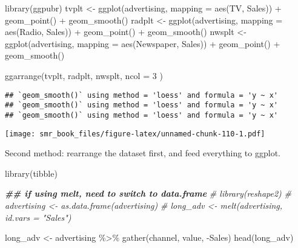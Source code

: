 \documentclass[
  oneside]{book}
\newenvironment{Shaded}{\begin{snugshade}}{\end{snugshade}}
\newcommand{\AttributeTok}[1]{\textcolor[rgb]{0.77,0.63,0.00}{#1}}
\newcommand{\CommentTok}[1]{\textcolor[rgb]{0.56,0.35,0.01}{\textit{#1}}}
\newcommand{\DecValTok}[1]{\textcolor[rgb]{0.00,0.00,0.81}{#1}}
\newcommand{\DocumentationTok}[1]{\textcolor[rgb]{0.56,0.35,0.01}{\textbf{\textit{#1}}}}
\newcommand{\FunctionTok}[1]{\textcolor[rgb]{0.00,0.00,0.00}{#1}}
\newcommand{\NormalTok}[1]{#1}
\newcommand{\OtherTok}[1]{\textcolor[rgb]{0.56,0.35,0.01}{#1}}
\newcommand{\SpecialCharTok}[1]{\textcolor[rgb]{0.00,0.00,0.00}{#1}}
\begin{document}
\begin{Shaded}
\begin{Highlighting}[]
\FunctionTok{library}\NormalTok{(ggpubr)}
\NormalTok{tvplt }\OtherTok{\textless{}{-}} \FunctionTok{ggplot}\NormalTok{(advertising, }\AttributeTok{mapping =} \FunctionTok{aes}\NormalTok{(TV, Sales)) }\SpecialCharTok{+}
  \FunctionTok{geom\_point}\NormalTok{() }\SpecialCharTok{+}
  \FunctionTok{geom\_smooth}\NormalTok{()}
\NormalTok{radplt }\OtherTok{\textless{}{-}} \FunctionTok{ggplot}\NormalTok{(advertising, }\AttributeTok{mapping =} \FunctionTok{aes}\NormalTok{(Radio, Sales)) }\SpecialCharTok{+}
  \FunctionTok{geom\_point}\NormalTok{() }\SpecialCharTok{+}
  \FunctionTok{geom\_smooth}\NormalTok{()}
\NormalTok{nwsplt }\OtherTok{\textless{}{-}} \FunctionTok{ggplot}\NormalTok{(advertising, }\AttributeTok{mapping =} \FunctionTok{aes}\NormalTok{(Newspaper, Sales)) }\SpecialCharTok{+}
  \FunctionTok{geom\_point}\NormalTok{() }\SpecialCharTok{+}
  \FunctionTok{geom\_smooth}\NormalTok{()}

\FunctionTok{ggarrange}\NormalTok{(tvplt, radplt, nwsplt,}
  \AttributeTok{ncol =} \DecValTok{3}
\NormalTok{)}
\end{Highlighting}
\end{Shaded}

\begin{verbatim}
## `geom_smooth()` using method = 'loess' and formula = 'y ~ x'
## `geom_smooth()` using method = 'loess' and formula = 'y ~ x'
## `geom_smooth()` using method = 'loess' and formula = 'y ~ x'
\end{verbatim}

\texttt{[image: smr\_book\_files/figure-latex/unnamed-chunk-110-1.pdf]}

Second method: rearrange the dataset first,
and feed everything to ggplot.

\begin{Shaded}
\begin{Highlighting}[]
\FunctionTok{library}\NormalTok{(tibble)}

\DocumentationTok{\#\# if using melt, need to switch to data.frame}
\CommentTok{\# library(reshape2)}
\CommentTok{\# advertising \textless{}{-} as.data.frame(advertising)}
\CommentTok{\# long\_adv \textless{}{-} melt(advertising, id.vars = "Sales")}

\NormalTok{long\_adv }\OtherTok{\textless{}{-}}\NormalTok{ advertising }\SpecialCharTok{\%\textgreater{}\%}
  \FunctionTok{gather}\NormalTok{(channel, value, }\SpecialCharTok{{-}}\NormalTok{Sales)}
\FunctionTok{head}\NormalTok{(long\_adv)}
\end{Highlighting}
\end{Shaded}
\end{document}
